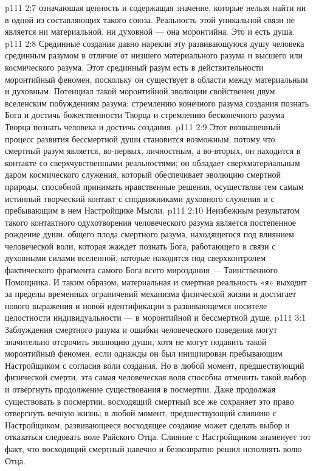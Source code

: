 \vs p111 2:7 \pc {}\bibnobreakspace {} означающая ценность и содержащая значение, которые нельзя найти ни в одной из составляющих такого союза. Реальность этой уникальной связи не является ни материальной, ни духовной --- она моронтийна. Это и есть душа.
\vs p111 2:8 \pc Срединные создания давно нарекли эту развивающуюся душу человека срединным разумом в отличие от низшего материального разума и высшего или космического разума. Этот срединный разум есть в действительности моронтийный феномен, поскольку он существует в области между материальным и духовным. Потенциал такой моронтийной эволюции свойственен двум вселенским побуждениям разума: стремлению конечного разума создания познать Бога и достичь божественности Творца и стремлению бесконечного разума Творца познать человека и достичь  создания.
\vs p111 2:9 Этот возвышенный процесс развития бессмертной души становится возможным, потому что смертный разум является, во\hyp{}первых, личностным, а во\hyp{}вторых, он находится в контакте со сверхчувственными реальностями; он обладает сверхматериальным даром космического служения, который обеспечивает эволюцию смертной природы, способной принимать нравственные решения, осуществляя тем самым истинный творческий контакт с сподвижниками духовного служения и с пребывающим в нем Настройщике Мысли.
\vs p111 2:10 Неизбежным результатом такого контактного одухотворения человеческого разума является постепенное рождение души, общего плода смертного разума, находящегося под влиянием человеческой воли, которая жаждет познать Бога, работающего в связи с духовными силами вселенной, которые находятся под сверхконтролем фактического фрагмента самого Бога всего мироздания --- Таинственного Помощника. И таким образом, материальная и смертная реальность «я» выходит за пределы временных ограничений механизма физической жизни и достигает нового выражения и новой идентификации в развивающемся носителе целостности индивидуальности --- в моронтийной и бессмертной душе.
\vs p111 3:1 Заблуждения смертного разума и ошибки человеческого поведения могут значительно отсрочить эволюцию души, хотя не могут подавить такой моронтийный феномен, если однажды он был инициирован пребывающим Настройщиком с согласия воли создания. Но в любой момент, предшествующий физической смерти, эта самая человеческая воля способна отменить такой выбор и отвергнуть продолжение существования в посмертии. Даже продолжая существовать в посмертии, восходящий смертный все же сохраняет это право отвергнуть вечную жизнь; в любой момент, предшествующий слиянию с Настройщиком, развивающееся восходящее создание может сделать выбор и отказаться следовать воле Райского Отца. Слияние с Настройщиком знаменует тот факт, что восходящий смертный навечно и безвозвратно решил исполнять волю Отца.
